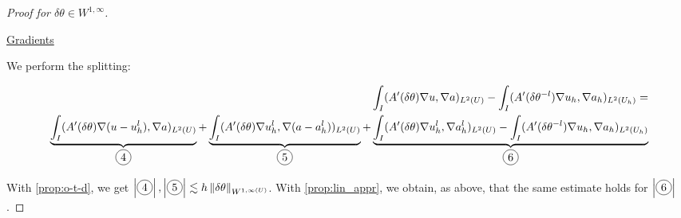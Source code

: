 \documentclass[english,a4paper,9pt,oneside]{scrbook}	%
\theoremstyle{break}
\newenvironment{mproof}[1][\proofname]{%
  \begin{proof}[#1]$ $\par\nobreak\ignorespaces
}{%
  \end{proof}
}
\renewcommand*{\proofname}{Proof}
\theoremstyle{remark}
\newcommand{\mR}{\mathbb{R}}
\newcommand{\ds}{\displaystyle}
\newcommand{\norm}[1]{\left\lVert#1\right\rVert}
\newcommand{\te}{\theta}
\newcommand{\dive}{\text{div}}
\newcommand*\circled[1]{\tikz[baseline=(char.base)]{
            \node[shape=circle,draw,inner sep=2pt] (char) {#1};}}
\begin{document}
\begin{mproof}[Proof for $\delta \te \in W^{1,\infty}$]





\underline{Gradients}

We perform the splitting:

\begin{align*}
	\int_I (A'(\delta\te )\nabla u, \nabla a)_{L^2(U)}-\int_I (A'(\delta\te^{-l} )\nabla u_h, \nabla a_h)_{L^2(U_h)} = \\
	\underbrace{\int_I (A'(\delta\te )\nabla (u-u_h^l), \nabla a)_{L^2(U)}}_{\circled{4}}+
	\underbrace{\int_I (A'(\delta\te )\nabla u_h^l, \nabla (a-a_h^l))_{L^2(U)}}_{\circled{5}}+
	\underbrace{\int_I (A'(\delta\te )\nabla u_h^l, \nabla a_h^l)_{L^2(U)} - \int_I (A'(\delta\te^{-l} )\nabla u_h, \nabla a_h)_{L^2(U_h)}}_{\circled{6}}
\end{align*}

With  \cref{prop:o-t-d}, we get $\ds  \left | \circled{4} \right |,  \left | \circled{5} \right | \lesssim h\norm{\delta \theta}_{W^{1,\infty(U)}}$. With \cref{prop:lin_appr}, we obtain, as above, that  the same estimate holds for $\left | \circled{6} \right |$.



\end{mproof}
\end{document}
